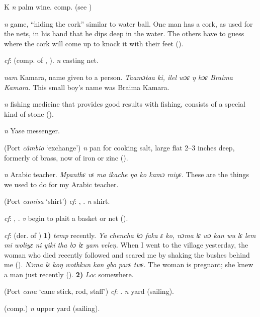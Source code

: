 \begin{letter}{K}
 \textit{n} palm wine. comp.  (see ) 

 \textit{n} game, “hiding the cork” similar to water ball. One man has a cork, as used for the nets, in his hand that he dips deep in the water. The others have to guess where the cork will come up to knock it with their feet (\citealt{Pichl1967}). 

 \textit{cf}:  (comp. of , ). \textit{n} casting net.

 \textit{nam} Kamara, name given to a person. \textit{Taamɔtaa ki, ilel wɔɛ ŋ hɔɛ Braima Kamara.} This small boy's name was Braima Kamara.

 \textit{n} fishing medicine that provides good results with fishing, consists of a special kind of stone (\citealt{Pichl1967}). 

 \textit{n} Yase messenger.

 (Port \textit{câmbio} ‘exchange') \textit{n} pan for cooking salt, large flat 2–3 inches deep, formerly of brass, now of iron or zinc (\citealt{Pichl1967}). 

 \textit{n} Arabic teacher. \textit{Mpanthɛ vɛ ma ikache ŋa ko kamɔ miyɛ.} These are the things we used to do for my Arabic teacher.

 (Port \textit{camisa} ‘shirt') \textit{cf}: , . \textit{n} shirt. 

 \textit{cf}: , . \textit{v} begin to plait a basket or net (\citealt{Pichl1967}). 

 \textit{cf}:  (der. of ) \textbf{1)} \textit{temp} recently. \textit{Ya chencha kɔ faka ɛ ko, nɔma lɛ wɔ kan wu lɛ lem mi woliyɛ ni yiki tha bɔ lɛ yam veleŋ.} When I went to the village yesterday, the woman who died recently followed and scared me by shaking the bushes behind me (\citealt{Pichl1967}). \textit{Nɔma lɛ koŋ wothkun kan gbo parɛ twɛ.} The woman is pregnant; she knew a man just recently (\citealt{Pichl1967}). \textbf{2)} \textit{Loc} somewhere.

 (Port \textit{cana} ‘cane stick, rod, staff') \textit{cf}: . \textit{n} yard (sailing).

 (comp.) \textit{n} upper yard (sailing).


\end{letter}
